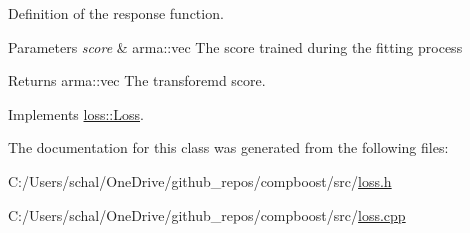 Definition of the response function. 


\begin{DoxyParams}{Parameters}
{\em score} & {\ttfamily arma\+::vec} The score trained during the fitting process\\
\hline
\end{DoxyParams}
\begin{DoxyReturn}{Returns}
{\ttfamily arma\+::vec} The transforemd score. 
\end{DoxyReturn}


Implements \mbox{\hyperlink{classloss_1_1_loss_a0a84b7df79b08e40b538aaa7e6ee75c4}{loss\+::\+Loss}}.



The documentation for this class was generated from the following files\+:\begin{DoxyCompactItemize}
\item 
C\+:/\+Users/schal/\+One\+Drive/github\+\_\+repos/compboost/src/\mbox{\hyperlink{loss_8h}{loss.\+h}}\item 
C\+:/\+Users/schal/\+One\+Drive/github\+\_\+repos/compboost/src/\mbox{\hyperlink{loss_8cpp}{loss.\+cpp}}\end{DoxyCompactItemize}
